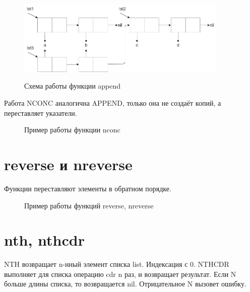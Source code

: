 \begin{figure}[H]
    \begin{imagebox}
        \centering
        \includegraphics[width=0.9\textwidth]{img/append.drawio.png}
        \label{fig:append-sheme}
    \end{imagebox}
    \caption{Схема работы функции append}
\end{figure}

Работа NCONC аналогична APPEND, только она не создаёт копий,
а переставляет указатели.

\begin{figure}[H]
    \begin{listingbox}{}
        
    \end{listingbox}
    \caption{Пример работы функции nconc}
    \label{lst:nconc-example}
\end{figure}

\section{reverse и nreverse}

Функции переставляют элементы в обратном порядке.

\begin{figure}[H]
    \begin{listingbox}{}
        
    \end{listingbox}
    \caption{Пример работы функций reverse, nreverse}
    \label{lst:reverse-nreverse-example}
\end{figure}

\section{nth, nthcdr}

NTH возвращает n-нный элемент списка list. Индексация с 0.
NTHCDR выполняет для списка операцию cdr n раз, и возвращает 
результат. Если N больше длины списка, то возвращается nil.
Отрицательное N вызовет ошибку.

